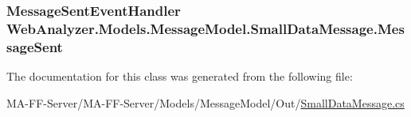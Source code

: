 \subsubsection[{Message\+Sent}]{\setlength{\rightskip}{0pt plus 5cm}Message\+Sent\+Event\+Handler Web\+Analyzer.\+Models.\+Message\+Model.\+Small\+Data\+Message.\+Message\+Sent}\label{class_web_analyzer_1_1_models_1_1_message_model_1_1_small_data_message_a818b24f7d28ba31b0db960023181ed68}


The documentation for this class was generated from the following file\+:\begin{DoxyCompactItemize}
\item 
M\+A-\/\+F\+F-\/\+Server/\+M\+A-\/\+F\+F-\/\+Server/\+Models/\+Message\+Model/\+Out/\hyperlink{_small_data_message_8cs}{Small\+Data\+Message.\+cs}\end{DoxyCompactItemize}
